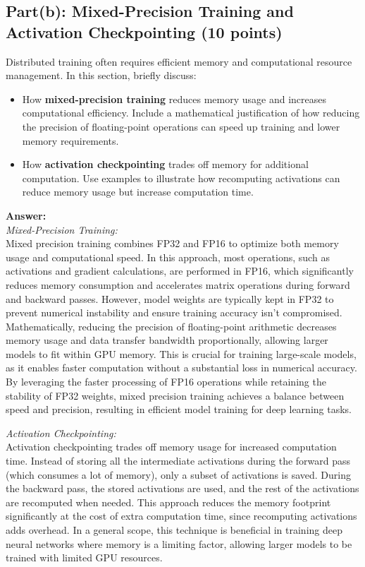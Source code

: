 \documentclass[11pt, oneside]{article}   	%
\begin{document}
\newpage

\subsection*{Part(b): Mixed-Precision Training and Activation Checkpointing (10 points)} 
Distributed training often requires efficient memory and computational resource management. In this section, briefly discuss:
\begin{itemize}
    \item How \textbf{mixed-precision training} reduces memory usage and increases computational efficiency. Include a mathematical justification of how reducing the precision of floating-point operations can speed up training and lower memory requirements.
    \item How \textbf{activation checkpointing} trades off memory for additional computation. Use examples to illustrate how recomputing activations can reduce memory usage but increase computation time.
\end{itemize}

\textbf{Answer:}
\\
\textit{Mixed-Precision Training: }
\\
Mixed precision training combines FP32 and FP16 to optimize both memory usage and computational speed. In this approach, most operations, such as activations and gradient calculations, are performed in FP16, which significantly reduces memory consumption and accelerates matrix operations during forward and backward passes. However, model weights are typically kept in FP32 to prevent numerical instability and ensure training accuracy isn't compromised.
\\
Mathematically, reducing the precision of floating-point arithmetic decreases memory usage and data transfer bandwidth proportionally, allowing larger models to fit within GPU memory. This is crucial for training large-scale models, as it enables faster computation without a substantial loss in numerical accuracy. By leveraging the faster processing of FP16 operations while retaining the stability of FP32 weights, mixed precision training achieves a balance between speed and precision, resulting in efficient model training for deep learning tasks.

\textit{Activation Checkpointing: }
\\
Activation checkpointing trades off memory usage for increased computation time. Instead of storing all the intermediate activations during the forward pass (which consumes a lot of memory), only a subset of activations is saved.
During the backward pass, the stored activations are used, and the rest of the activations are recomputed when needed.
This approach reduces the memory footprint significantly at the cost of extra computation time, since recomputing activations adds overhead.
In a general scope, this technique is beneficial in training deep neural networks where memory is a limiting factor, allowing larger models to be trained with limited GPU resources.
\end{document}
